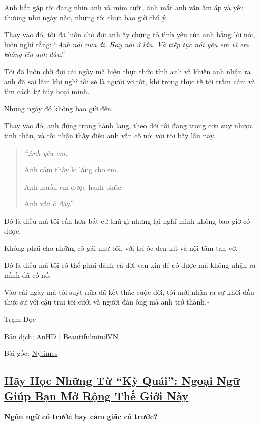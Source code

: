 \documentclass{article}
\begin{document}
%
Anh bắt gặp tôi đang nhìn anh và mỉm cười, ánh mắt anh vẫn ấm áp và yêu thương như ngày nào, nhưng tôi chưa bao giờ chú ý.

Thay vào đó, tôi đã luôn chờ đợi anh ấy chứng tỏ tình yêu của anh bằng lời nói, luôn nghĩ rằng: ``\textit{Anh nói nữa đi. Hãy nói 3 lần. Và tiếp tục nói yêu em vì em không tin anh đâu}.''

%
Tôi đã luôn chờ đợi cái ngày mà hiện thực thức tỉnh anh và khiến anh nhận ra anh đã sai lầm khi nghĩ tôi sẽ là người vợ tốt, khi trong thực tế tôi trầm cảm và tìm cách tự hủy hoại mình.

Nhưng ngày đó không bao giờ đến.

%
Thay vào đó, anh đứng trong hành lang, theo dõi tôi đang trong cơn suy nhược tinh thần, và tôi nhận thấy điều anh vẫn cố nói với tôi bấy lâu nay.

\begin{quotation}
	\it
	``Anh yêu em.
	
	Anh cảm thấy lo lắng cho em.
	
	Anh muốn em được hạnh phúc.
	
	Anh vẫn ở đây.''    
\end{quotation}
Đó là điều mà tôi cần hơn bất cứ thứ gì nhưng lại nghĩ mình không bao giờ có được.

Không phải cho những cô gái như tôi, với trí óc đen kịt và nội tâm tan vỡ.

Đó là điều mà tôi có thể phải dành cả đời van xin để có được mà không nhận ra mình đã có nó.

Vào cái ngày mà tôi suýt nữa đã kết thúc cuộc đời, tôi mới nhận ra sự khởi đầu thực sự với cậu trai tôi cưới và người đàn ông mà anh trở thành.\hfill$\square$

\begin{flushright}
	Trạm Đọc
	
	Bản dịch: \href{https://beautifulmindvn.com/2016/05/11/tro-lai-tu-bo-vuc/}{AnHD | BeautifulmindVN}
	
	Bài gốc: \href{https://www.nytimes.com/2015/06/07/style/crawling-back-from-the-ledge.html?_r=2}{Nytimes}
\end{flushright}


\subsection{\href{http://tramdoc.vn/tin-tuc/hay-hoc-nhung-tu-ky-quai-ngoai-ngu-giup-ban-mo-rong-the-gioi-nay-nDdaOW.html}{Hãy Học Những Từ ``Kỳ Quái'': Ngoại Ngữ Giúp Bạn Mở Rộng Thế Giới Này}}
\textbf{ Ngôn ngữ có trước hay cảm giác có trước?}
\end{document}
